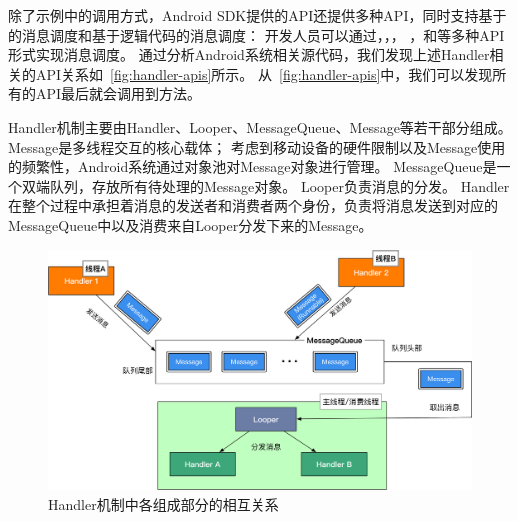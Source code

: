 除了示例中的调用方式，Android SDK提供的API\cite{HandlerA26:online}还提供多种API，同时支持基于的消息调度和基于逻辑代码的消息调度：
开发人员可以通过，，，
 ，和等多种API形式实现消息调度。
 通过分析Android系统相关源代码，我们发现上述Handler相关的API关系如~\autoref{fig:handler-apis}所示。
从~\autoref{fig:handler-apis}中，我们可以发现所有的API最后就会调用到方法。


Handler机制主要由Handler、Looper、MessageQueue、Message等若干部分组成。
 Message是多线程交互的核心载体；
考虑到移动设备的硬件限制以及Message使用的频繁性，Android系统通过对象池对Message对象进行管理。
MessageQueue是一个双端队列，存放所有待处理的Message对象。
Looper负责消息的分发。
Handler在整个过程中承担着消息的发送者和消费者两个身份，负责将消息发送到对应的MessageQueue中以及消费来自Looper分发下来的Message。

\begin{figure}[!hb]
	\centering
	\includegraphics[width=\textwidth]{./Figures/Handler-framework.png}
	\caption{ Handler机制中各组成部分的相互关系}
	\label{fig:handler-framework}
\end{figure}

